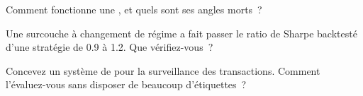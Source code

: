 \begin{interviewq}\label{iq:ml:clustering-regimes-and-anomaly-detection:4}
Comment fonctionne une , et quels sont ses angles morts~?
\end{interviewq}

\begin{interviewq}\label{iq:ml:clustering-regimes-and-anomaly-detection:5}
Une surcouche à changement de régime a fait passer le ratio de Sharpe backtesté d'une stratégie de 0.9 à 1.2. Que vérifiez-vous~?
\end{interviewq}

\begin{interviewq}\label{iq:ml:clustering-regimes-and-anomaly-detection:6}
Concevez un système de  pour la surveillance des transactions. Comment l'évaluez-vous sans disposer de beaucoup d'étiquettes~?
\end{interviewq}

